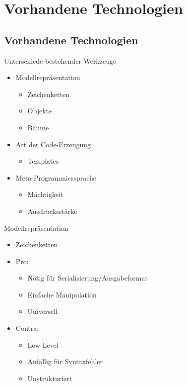 \documentclass{beamer}
\begin{document}
\section{Vorhandene Technologien}
\subsection{Vorhandene Technologien}

\begin{frame}{Unterschiede bestehender Werkzeuge}
  \begin{itemize}
  \item Modellrepräsentation
    \begin{itemize}
    \item Zeichenketten
    \item Objekte
    \item Bäume
    \end{itemize}
  \item Art der Code-Erzeugung
    \begin{itemize}
    \item Templates
    \end{itemize}
  \item Meta-Programmiersprache
    \begin{itemize}
    \item Mächtigkeit
    \item Ausdrucksstärke
    \end{itemize}
  \end{itemize}
\end{frame}

\begin{frame}{Modellrepräsentation}
  \begin{itemize}
  \item Zeichenketten
  \item Pro:
    \begin{itemize}
    \item Nötig für Serialisierung/Ausgabeformat
    \item Einfache Manipulation
    \item Universell
    \end{itemize}
  \item Contra:
    \begin{itemize}
    \item Low-Level
    \item Anfällig für Syntaxfehler
    \item Unstrukturiert
    \end{itemize}
  \end{itemize} 
\end{frame}
\end{document}
